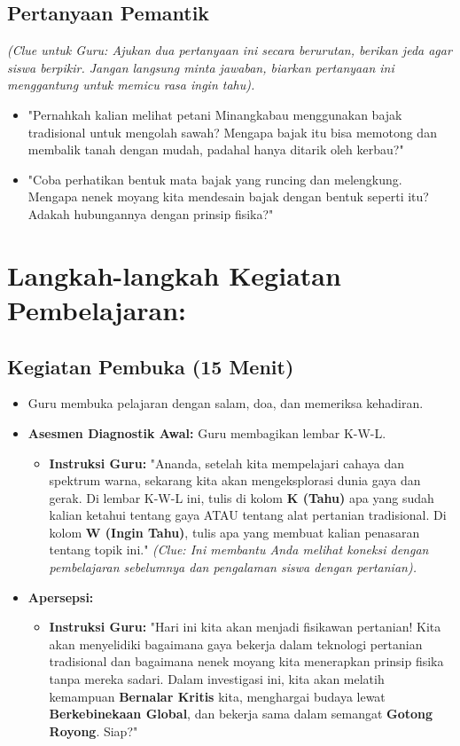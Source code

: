 \documentclass[12pt,a4paper]{article}
\begin{document}
\subsection{Pertanyaan Pemantik}
\textit{(Clue untuk Guru: Ajukan dua pertanyaan ini secara berurutan, berikan jeda agar siswa berpikir. Jangan langsung minta jawaban, biarkan pertanyaan ini menggantung untuk memicu rasa ingin tahu).}

\begin{itemize}
\item "Pernahkah kalian melihat petani Minangkabau menggunakan bajak tradisional untuk mengolah sawah? Mengapa bajak itu bisa memotong dan membalik tanah dengan mudah, padahal hanya ditarik oleh kerbau?"
\item "Coba perhatikan bentuk mata bajak yang runcing dan melengkung. Mengapa nenek moyang kita mendesain bajak dengan bentuk seperti itu? Adakah hubungannya dengan prinsip fisika?"
\end{itemize}

\section{Langkah-langkah Kegiatan Pembelajaran:}

\subsection{Kegiatan Pembuka (15 Menit)}
\begin{itemize}
\item Guru membuka pelajaran dengan salam, doa, dan memeriksa kehadiran.
\item \textbf{Asesmen Diagnostik Awal:} Guru membagikan lembar K-W-L.
    \begin{itemize}
    \item \textbf{Instruksi Guru:} "Ananda, setelah kita mempelajari cahaya dan spektrum warna, sekarang kita akan mengeksplorasi dunia gaya dan gerak. Di lembar K-W-L ini, tulis di kolom \textbf{K (Tahu)} apa yang sudah kalian ketahui tentang gaya ATAU tentang alat pertanian tradisional. Di kolom \textbf{W (Ingin Tahu)}, tulis apa yang membuat kalian penasaran tentang topik ini." \textit{(Clue: Ini membantu Anda melihat koneksi dengan pembelajaran sebelumnya dan pengalaman siswa dengan pertanian).}
    \end{itemize}
\item \textbf{Apersepsi:}
    \begin{itemize}
    \item \textbf{Instruksi Guru:} "Hari ini kita akan menjadi fisikawan pertanian! Kita akan menyelidiki bagaimana gaya bekerja dalam teknologi pertanian tradisional dan bagaimana nenek moyang kita menerapkan prinsip fisika tanpa mereka sadari. Dalam investigasi ini, kita akan melatih kemampuan \textbf{Bernalar Kritis} kita, menghargai budaya lewat \textbf{Berkebinekaan Global}, dan bekerja sama dalam semangat \textbf{Gotong Royong}. Siap?"
    \end{itemize}
\end{itemize}
\end{document}
